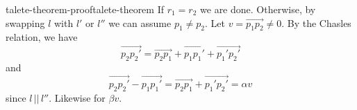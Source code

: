 \documentclass[preview]{standalone}
\begin{document}
\begin{snippetproof}{talete-theorem-proof}{talete-theorem}{}
    If \(r_1 = r_2\) we are done. Otherwise,
    by swapping \(l\) with \(l'\) or \(l''\) we can assume \(p_1 \neq p_2\).
    Let \(v = \vec{p_1p_2} \neq 0\). By the Chasles relation, we have
    \[
        \vec{p_2p_2'} = \vec{p_2p_1} + \vec{p_1p_1'} + \vec{p_1'p_2'}
    \]
    and
    \[
        \vec{p_2p_2'} - \vec{p_1p_1'} = \vec{p_2p_1} + \vec{p_1'p_2'} = \alpha v
    \]
    since \(l \,||\, l''\). Likewise for \(\beta v\).
\end{snippetproof}
\end{document}
